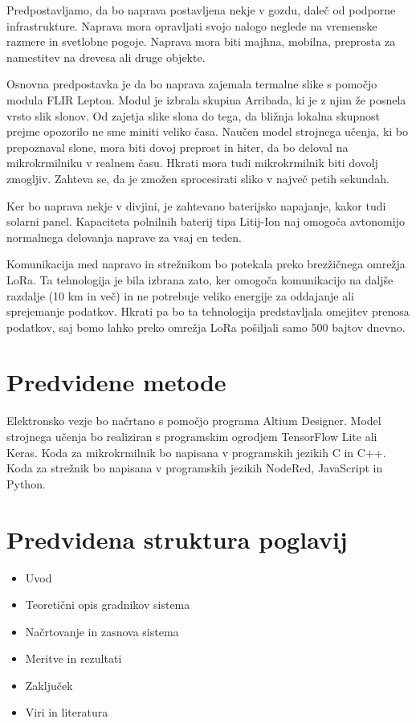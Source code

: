 \documentclass[a4paper,12pt]{article}
\begin{document}
Predpostavljamo, da bo naprava postavljena nekje v gozdu, daleč od podporne infrastrukture.
Naprava mora opravljati svojo nalogo neglede na vremenske razmere in svetlobne pogoje. 
Naprava mora biti majhna, mobilna, preprosta za namestitev na drevesa ali druge objekte.

Osnovna predpostavka je da bo naprava zajemala termalne slike s pomočjo modula FLIR Lepton. 
Modul je izbrala skupina Arribada, ki je z njim že posnela vrsto slik slonov.
Od zajetja slike slona do tega, da bližnja lokalna skupnost prejme opozorilo ne sme miniti veliko časa.
Naučen model strojnega učenja, ki bo prepoznaval slone, mora biti dovoj preprost in hiter, da bo deloval na mikrokrmilniku v realnem času.
Hkrati mora tudi mikrokrmilnik biti dovolj zmogljiv.
Zahteva se, da je zmožen sprocesirati sliko v največ petih sekundah. 

Ker bo naprava nekje v divjini, je zahtevano baterijsko napajanje, kakor tudi solarni panel. 
Kapaciteta polnilnih baterij tipa Litij-Ion naj omogoča avtonomijo normalnega delovanja naprave za vsaj en teden.

Komunikacija med napravo in strežnikom bo potekala preko brezžičnega omrežja LoRa.
Ta tehnologija je bila izbrana zato, ker omogoča komunikacijo na daljše razdalje (10 km in več) in ne potrebuje veliko energije za oddajanje ali sprejemanje podatkov.
Hkrati pa bo ta tehnologija predstavljala omejitev prenosa podatkov, saj bomo lahko preko omrežja LoRa pošiljali samo 500 bajtov dnevno. 

\vspace{\baselineskip}


\section{ Predvidene metode}

Elektronsko vezje bo načrtano s pomočjo programa Altium Designer.
Model strojnega učenja bo realiziran s programskim ogrodjem TensorFlow Lite ali Keras.
Koda za mikrokrmilnik bo napisana v programskih jezikih C in C++.
Koda za strežnik bo napisana v programskih jezikih NodeRed, JavaScript in Python.

\vspace{\baselineskip}


\section{ Predvidena struktura poglavij}
\begin{itemize}
    \item Uvod 
    \item Teoretični opis gradnikov sistema
    \item Načrtovanje in zasnova sistema  
    \item Meritve in rezultati
    \item Zaključek 
    \item Viri in literatura
\end{itemize}
\vspace{\baselineskip}
\end{document}
